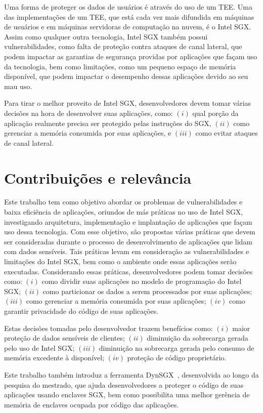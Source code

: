 Uma forma de proteger os dados de usuários é através do uso de um TEE. Uma das
implementações de um TEE, que está cada vez mais difundida em máquinas de
usuários e em máquinas servidoras de computação na nuvem, é o Intel SGX. Assim
como qualquer outra tecnologia, Intel SGX também possui vulnerabilidades, como
falta de proteção contra ataques de canal lateral, que podem impactar as
garantias de segurança providas por aplicações que façam uso da tecnologia, bem
como limitações, como um pequeno espaço de memória disponível, que podem
impactar o desempenho dessas aplicações devido ao seu mau uso.

Para tirar o melhor proveito de Intel SGX, desenvolvedores devem tomar várias
decisões na hora de desenvolver suas aplicações, como: $(i)$ qual porção da
aplicação realmente precisa ser protegido pelas instruções do SGX, $(ii)$ como
gerenciar a memória consumida por suas aplicações, e $(iii)$ como evitar ataques
de canal lateral.

\section{Contribuições e relevância}
\label{sec:intro_contribuicoes}

Este trabalho tem como objetivo abordar os problemas de vulnerabilidades e baixa
eficiência de aplicações, oriundos de más práticas no uso de Intel SGX,
investigando arquitetura, implementação e implantação de aplicações que façam
uso dessa tecnologia. Com esse objetivo, são propostas várias práticas que devem
ser consideradas durante o processo de desenvolvimento de aplicações que lidam
com dados sensíveis. Tais práticas levam em consideração as vulnerabilidades e
limitações do Intel SGX, bem como o ambiente onde essas aplicações serão
executadas. Considerando essas práticas, desenvolvedores podem tomar decisões
como: $(i)$ como dividir suas aplicações no modelo de programação do Intel SGX;
$(ii)$ como particionar os dados a serem processados por suas aplicações;
$(iii)$ como gerenciar a memória consumida por suas aplicações; $(iv)$ como
garantir privacidade do código de suas aplicações.

Estas decisões tomadas pelo desenvolvedor trazem benefícios como: $(i)$ maior
proteção de dados sensíveis de clientes; $(ii)$ diminuição da sobrecarga gerada
pelo uso de Intel SGX; $(iii)$ diminuição na sobrecarga gerada pelo consumo de
memória excedente à disponível; $(iv)$ proteção de código proprietário.

Este trabalho também introduz a ferramenta DynSGX~\cite{DynSGXCloudCom2017},
desenvolvida ao longo da pesquisa do mestrado, que ajuda desenvolvedores a
proteger o código de suas aplicações usando enclaves SGX, bem como possibilita
uma melhor gerência de memória de enclaves ocupada por código das aplicações.

